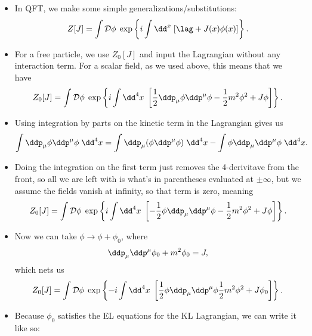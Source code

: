 \begin{itemize}
    \item In QFT, we make some simple generalizations/substitutions:
        \begin{equation}
            Z[J] = \int\mathcal{D}\phi \;\exp\left\{ i\int\dd^x \; [\lag + J(x)\phi(x)] \right\}.
        \end{equation}
    \item For a free particle, we use $Z_0[J]$ and input the Lagrangian without any interaction term. For a scalar field, as we used above, this means that we have
        \begin{equation}
            Z_0[J] = \int\mathcal{D}\phi \;\exp\left\{ i\int\dd^4x \; \left[ \frac{1}{2}\ddp_{\mu}\phi\ddp^{\mu}\phi - \frac{1}{2}m^2\phi^2 + J\phi \right] \right\}.
        \end{equation}
    \item Using integration by parts on the kinetic term in the Lagrangian gives us
        \begin{equation}
            \int \ddp_{\mu}\phi\ddp^{\mu}\phi \;\dd^4x = \int \ddp_{\mu}(\phi\ddp^{\mu}\phi) \;\dd^4x - \int \phi\ddp_{\mu}\ddp^{\mu}\phi \;\dd^4x.
        \end{equation}
    \item Doing the integration on the first term just removes the 4-derivitave from the front, so all we are left with is what's in parentheses evaluated at $\pm\infty$, but we assume the fields vanish at infinity, so that term is zero, meaning 
        \begin{equation}
            Z_0[J] = \int\mathcal{D}\phi \;\exp\left\{ i\int\dd^4x \; \left[ -\frac{1}{2}\phi\ddp_{\mu}\ddp^{\mu}\phi - \frac{1}{2}m^2\phi^2 + J\phi \right] \right\}.
        \end{equation}
    \item Now we can take $\phi \rightarrow \phi + \phi_0$, where 
        \begin{equation}
            \ddp_{\mu}\ddp^{\mu}\phi_0 + m^2\phi_0 = J,
        \end{equation}
        which nets us
        \begin{equation}
            Z_0[J] = \int\mathcal{D}\phi \;\exp\left\{ -i\int\dd^4x \; \left[ \frac{1}{2}\phi\ddp_{\mu}\ddp^{\mu}\phi  \frac{1}{2}m^2\phi^2 + J\phi_0 \right] \right\}.
        \end{equation}
    \item Because $\phi_0$ satisfies the EL equations for the KL Lagrangian, we can write it like so:

\end{itemize}
